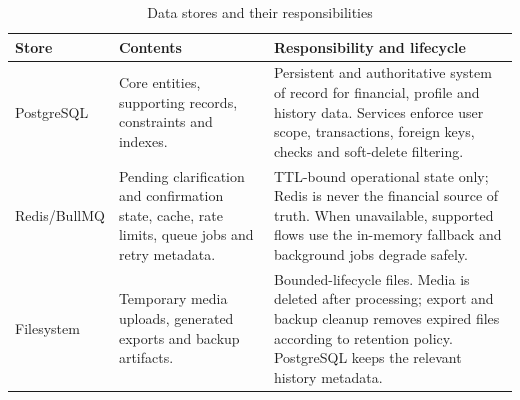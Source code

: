 \begin{table}[H]
  \centering
  \caption{Data stores and their responsibilities}
  \label{tab:data-stores}
  \begin{tabularx}{\textwidth}{@{}L{3.0cm}L{3.7cm}Y@{}}
    \toprule
    \textbf{Store} & \textbf{Contents} & \textbf{Responsibility and lifecycle} \\
    \midrule
    PostgreSQL & Core entities, supporting records, constraints and indexes. & Persistent and authoritative system of record for financial, profile and history data. Services enforce user scope, transactions, foreign keys, checks and soft-delete filtering. \\
    Redis/BullMQ & Pending clarification and confirmation state, cache, rate limits, queue jobs and retry metadata. & TTL-bound operational state only; Redis is never the financial source of truth. When unavailable, supported flows use the in-memory fallback and background jobs degrade safely. \\
    Filesystem & Temporary media uploads, generated exports and backup artifacts. & Bounded-lifecycle files. Media is deleted after processing; export and backup cleanup removes expired files according to retention policy. PostgreSQL keeps the relevant history metadata. \\
    \bottomrule
  \end{tabularx}
\end{table}

